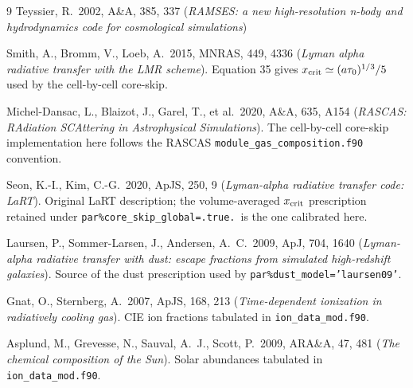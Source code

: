 \documentclass[english,a4paper]{my_memo}
\begin{document}
\begin{thebibliography}{9}
Teyssier, R.\ 2002, A\&A, 385, 337
(\textit{RAMSES: a new high-resolution n-body and hydrodynamics code for
cosmological simulations})

Smith, A., Bromm, V., Loeb, A.\ 2015, MNRAS, 449, 4336
(\textit{Lyman alpha radiative transfer with the LMR scheme}).
Equation 35 gives $x_{\rm crit} \simeq (a\tau_0)^{1/3}/5$ used by the
cell-by-cell core-skip.

Michel-Dansac, L., Blaizot, J., Garel, T., et al.\ 2020, A\&A, 635, A154
(\textit{RASCAS: RAdiation SCAttering in Astrophysical Simulations}).
The cell-by-cell core-skip implementation here follows the RASCAS
\texttt{module\_gas\_composition.f90} convention.

Seon, K.-I., Kim, C.-G.\ 2020, ApJS, 250, 9
(\textit{Lyman-alpha radiative transfer code: LaRT}).
Original LaRT description; the volume-averaged $x_{\rm crit}$
prescription retained under \texttt{par\%core\_skip\_global=.true.}\ is
the one calibrated here.

Laursen, P., Sommer-Larsen, J., Andersen, A.\ C.\ 2009, ApJ, 704, 1640
(\textit{Lyman-alpha radiative transfer with dust: escape fractions from
simulated high-redshift galaxies}).  Source of the dust prescription
used by \texttt{par\%dust\_model='laursen09'}.

Gnat, O., Sternberg, A.\ 2007, ApJS, 168, 213
(\textit{Time-dependent ionization in radiatively cooling gas}).
CIE ion fractions tabulated in \texttt{ion\_data\_mod.f90}.

Asplund, M., Grevesse, N., Sauval, A.\ J., Scott, P.\ 2009, ARA\&A, 47, 481
(\textit{The chemical composition of the Sun}).
Solar abundances tabulated in \texttt{ion\_data\_mod.f90}.
\end{thebibliography}
\end{document}

